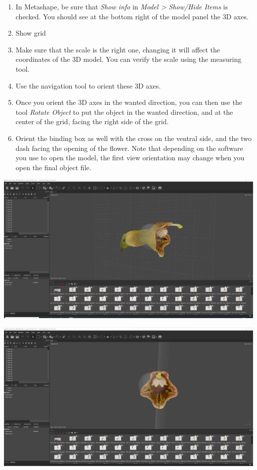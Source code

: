 \documentclass[
]{book}
\begin{document}
\begin{enumerate}
\def\labelenumi{\arabic{enumi}.}
\item
  In Metashape, be sure that \emph{Show info} in \emph{Model \textgreater{} Show/Hide Items}
  is checked. You should see at the bottom right of the model panel
  the 3D axes.
\item
  Show grid
\item
  Make sure that the scale is the right one, changing it will affect
  the coordinates of the 3D model. You can verify the scale using the
  measuring tool.
\item
  Use the navigation tool to orient these 3D axes.
\item
  Once you orient the 3D axes in the wanted direction, you can then
  use the tool \emph{Rotate Object} to put the object in the wanted
  direction, and at the center of the grid, facing the right side of
  the grid.
\item
  Orient the binding box as well with the cross on the ventral side,
  and the two dash facing the opening of the flower. Note that
  depending on the software you use to open the model, the first view
  orientation may change when you open the final object file.
\end{enumerate}

\includegraphics[width=1\textwidth,height=\textheight]{Figures/metashape_orientation.png}

\includegraphics[width=1\textwidth,height=\textheight]{Figures/metashape_orientation_2.png}
\end{document}
